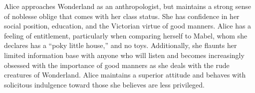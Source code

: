 \documentclass[icon]{twentysecondcv}
\begin{document}
Alice approaches Wonderland as an anthropologist, but maintains a strong sense of noblesse oblige that comes with her class status. She has confidence in her social position, education, and the Victorian virtue of good manners. Alice has a feeling of entitlement, particularly when comparing herself to Mabel, whom she declares has a “poky little house,” and no toys. Additionally, she flaunts her limited information base with anyone who will listen and becomes increasingly obsessed with the importance of good manners as she deals with the rude creatures of Wonderland. Alice maintains a superior attitude and behaves with solicitous indulgence toward those she believes are less privileged.

\end{document}

